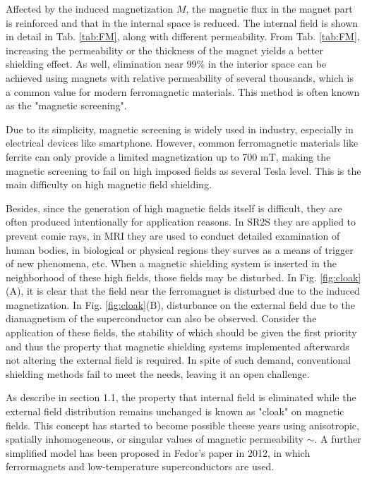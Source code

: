 Affected by the induced magnetization $M$, the magnetic flux in the magnet part is reinforced and that in the internal space is reduced.
The internal field is shown in detail in Tab. \ref{tab:FM}, along with different permeability.
From Tab. \ref{tab:FM},
increasing the permeability or the thickness of the magnet yields a better shielding effect.
As well, elimination near 99\% in the interior space can be achieved using magnets with relative permeability of several thousands,
which is a common value for modern ferromagnetic materials.
This method is often known as the "magnetic screening".

Due to its simplicity, magnetic screening is widely used in industry, especially in electrical devices like smartphone.
However, common ferromagnetic materials like ferrite can only provide a limited magnetization up to 700 mT,
making the magnetic screening to fail on high imposed fields as several Tesla level.
This is the main difficulty on high magnetic field shielding.

Besides, since the generation of high magnetic fields itself is difficult, they are often produced intentionally for application reasons.
In SR2S they are applied to prevent comic rays, in MRI they are used to conduct detailed examination of human bodies,
in biological or physical regions they surves as a means of trigger of new phenomena, etc.
When a magnetic shielding system is inserted in the neighborhood of these high fields,
those fields may be disturbed.
In Fig. \ref{fig:cloak}(A), it is clear that the field near the ferromagnet is disturbed due to the induced magnetization.
In Fig. \ref{fig:cloak}(B), disturbance on the external field due to the diamagnetism of the superconductor can also be observed.
Consider the application of these fields, the stability of which should be given the first priority and thus
the property that magnetic shielding systems implemented afterwards not altering the external field is required.
In spite of such demand, conventional shielding methods fail to meet the needs, leaving it an open challenge.

As describe in section 1.1, the property that internal field is eliminated while the external field distribution remains unchanged
is known as "cloak" on magnetic fields.
This concept has started to become possible theese years using anisotropic, spatially inhomogeneous, or singular values of magnetic permeability \cite{1_1_8}$\sim$\cite{1_1_11}.
A further simplified model has been proposed in Fedor's paper \cite{1_1_6} in 2012, in which ferrormagnets and low-temperature superconductors are used.


